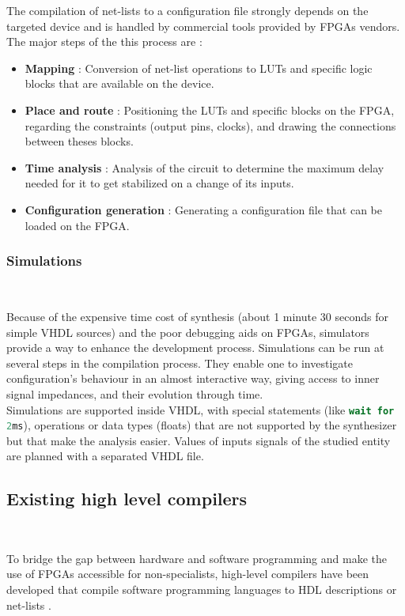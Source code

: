 \documentclass[10pt,a4paper]{article}
\renewcommand{\indent}{~\\\vspace{-.8cm}}
\begin{document}
The compilation of net-lists to a configuration file strongly depends on the targeted device and is handled by commercial tools provided by FPGAs vendors.  The major steps of the this process are :

\begin{itemize}
	\item \textbf{Mapping} : Conversion of net-list operations to LUTs and specific logic blocks that are available on the device.
	\item \textbf{Place and route} : Positioning the LUTs and specific blocks on the FPGA, regarding the constraints (output pins, clocks), and drawing the connections between theses blocks.
	\item \textbf{Time analysis} : Analysis of the circuit to determine the maximum delay needed for it to get stabilized on a change of its inputs.
	\item \textbf{Configuration generation} : Generating a configuration file that can be loaded on the FPGA.
\end{itemize}


\subsubsection{Simulations} \indent

Because of the expensive time cost of synthesis (about 1 minute 30 seconds for simple VHDL sources) and the poor debugging aids on FPGAs, simulators provide a way to enhance the development process. Simulations can be run at several steps in the compilation process.
They enable one to investigate configuration's behaviour in an almost interactive way, giving access to inner signal impedances, and their evolution through time.\\

Simulations are supported inside VHDL, with special statements (like \lstinline[language=VHDL,basicstyle=\ttfamily\normalsize]{wait for 2ms}), operations or data types (floats) that are not supported by the synthesizer but that make the analysis easier. Values of inputs signals of the studied entity are planned with a separated VHDL file.





\subsection{Existing high level compilers} \indent

To bridge the gap between hardware and software programming and make the use of FPGAs accessible for non-specialists, high-level compilers have been developed that compile software programming languages to HDL descriptions \cite{bacon2013fpga} or net-lists \cite{iseli1995c++}.
\end{document}
